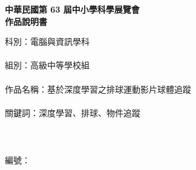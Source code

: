 \begin{titlepage}
    \begin{center}
        \vspace{2cm}
        \Large \textbf{中華民國第 63 屆中小學科學展覽會\\作品說明書}
        \vspace{2cm}
    \end{center}
    \Large 科\hspace{2em}別：電腦與資訊學科\\\\
    \Large 組\hspace{2em}別：高級中等學校組\\\\
    \Large 作品名稱：基於深度學習之排球運動影片球體追蹤\\\\
    \Large 關\hspace{0.5em}鍵\hspace{0.5em}詞：深度學習、排球、物件追蹤\\\\\\\\
    \Large 編\hspace{2em}號：
\end{titlepage}